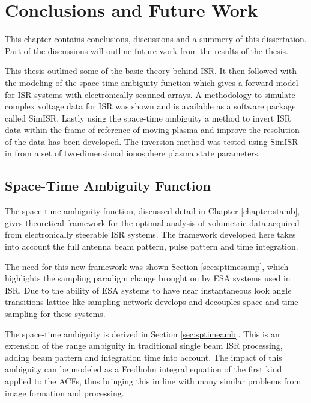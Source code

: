 \chapter{Conclusions and Future Work}
\label{chapter:Conclusions}
\thispagestyle{myheadings}
\graphicspath{{6_Conclusion/Figures/}}

\graphicspath{{6_Conclusion/Figures/}}
This chapter contains conclusions, discussions and a summery of this dissertation. Part of the discussions will outline future work from the results of the thesis.

This thesis outlined some of the basic theory behind ISR. It then followed with the modeling of the space-time ambiguity function which gives a forward model for ISR systems with electronically scanned arrays. A methodology to simulate complex voltage data for ISR was shown and is available as a software package called SimISR. Lastly using the space-time ambiguity a method to invert ISR data within the frame of reference of moving plasma and improve the resolution of the data has been developed. The inversion method was tested using SimISR in from a set of two-dimensional ionosphere plasma state parameters.

\section{Space-Time Ambiguity Function}
The space-time ambiguity function, discussed detail in Chapter \ref{chapter:stamb}, gives theoretical framework for the optimal analysis of volumetric data acquired from electronically steerable ISR systems. The framework developed here takes into account the full antenna beam pattern, pulse pattern and time integration.

The need for this new framework was shown Section \ref{sec:sptimesamp}, which highlights the sampling paradigm change brought on by ESA systems used in ISR. Due to the ability of ESA systems to have near instantaneous look angle transitions lattice like sampling network develops and decouples space and time sampling for these systems.

The space-time ambiguity is derived in Section \ref{sec:sptimeamb}. This is an extension of the range ambiguity in traditional single beam ISR processing, adding beam pattern and integration time into account. The impact of this ambiguity can be modeled as a Fredholm integral equation of the first kind applied to the ACFs, thus bringing this in line with many similar problems from image formation and processing.

